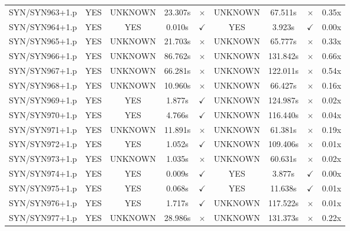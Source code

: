\documentclass[a4paper,10pt]{article}
\begin{document}
\begin{longtable}{lcccccccc}
SYN/SYN963+1.p & YES & UNKNOWN & 23.307s & \cellcolor{mismatchcolor}$\times$ & UNKNOWN & 67.511s & \cellcolor{mismatchcolor}$\times$ & 0.35x \\
SYN/SYN964+1.p & YES & YES & 0.010s & \cellcolor{matchcolor}$\checkmark$ & YES & 3.923s & \cellcolor{matchcolor}$\checkmark$ & 0.00x \\
SYN/SYN965+1.p & YES & UNKNOWN & 21.703s & \cellcolor{mismatchcolor}$\times$ & UNKNOWN & 65.777s & \cellcolor{mismatchcolor}$\times$ & 0.33x \\
SYN/SYN966+1.p & YES & UNKNOWN & 86.762s & \cellcolor{mismatchcolor}$\times$ & UNKNOWN & 131.842s & \cellcolor{mismatchcolor}$\times$ & 0.66x \\
SYN/SYN967+1.p & YES & UNKNOWN & 66.281s & \cellcolor{mismatchcolor}$\times$ & UNKNOWN & 122.011s & \cellcolor{mismatchcolor}$\times$ & 0.54x \\
SYN/SYN968+1.p & YES & UNKNOWN & 10.960s & \cellcolor{mismatchcolor}$\times$ & UNKNOWN & 66.427s & \cellcolor{mismatchcolor}$\times$ & 0.16x \\
SYN/SYN969+1.p & YES & YES & 1.877s & \cellcolor{matchcolor}$\checkmark$ & UNKNOWN & 124.987s & \cellcolor{mismatchcolor}$\times$ & 0.02x \\
SYN/SYN970+1.p & YES & YES & 4.766s & \cellcolor{matchcolor}$\checkmark$ & UNKNOWN & 116.440s & \cellcolor{mismatchcolor}$\times$ & 0.04x \\
SYN/SYN971+1.p & YES & UNKNOWN & 11.891s & \cellcolor{mismatchcolor}$\times$ & UNKNOWN & 61.381s & \cellcolor{mismatchcolor}$\times$ & 0.19x \\
SYN/SYN972+1.p & YES & YES & 1.052s & \cellcolor{matchcolor}$\checkmark$ & UNKNOWN & 109.406s & \cellcolor{mismatchcolor}$\times$ & 0.01x \\
SYN/SYN973+1.p & YES & UNKNOWN & 1.035s & \cellcolor{mismatchcolor}$\times$ & UNKNOWN & 60.631s & \cellcolor{mismatchcolor}$\times$ & 0.02x \\
SYN/SYN974+1.p & YES & YES & 0.009s & \cellcolor{matchcolor}$\checkmark$ & YES & 3.877s & \cellcolor{matchcolor}$\checkmark$ & 0.00x \\
SYN/SYN975+1.p & YES & YES & 0.068s & \cellcolor{matchcolor}$\checkmark$ & YES & 11.638s & \cellcolor{matchcolor}$\checkmark$ & 0.01x \\
SYN/SYN976+1.p & YES & YES & 1.717s & \cellcolor{matchcolor}$\checkmark$ & UNKNOWN & 117.522s & \cellcolor{mismatchcolor}$\times$ & 0.01x \\
SYN/SYN977+1.p & YES & UNKNOWN & 28.986s & \cellcolor{mismatchcolor}$\times$ & UNKNOWN & 131.373s & \cellcolor{mismatchcolor}$\times$ & 0.22x \\

\end{longtable}
\end{document}
